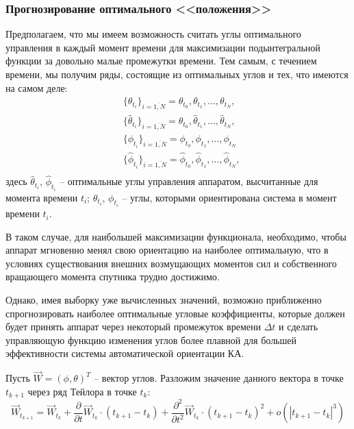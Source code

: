 \subsubsection{Прогнозирование оптимального <<положения>>}
\noindent\indent Предполагаем, что мы имеем возможность считать углы оптимального
управления в каждый момент времени для максимизации подынтегральной функции за довольно
малые промежутки времени. Тем самым, с течением времени, мы получим ряды, состоящие
из оптимальных углов и тех, что имеются на самом деле:
\begin{equation}
  \begin{aligned}
    &\{\theta_{t_i}\}_{i=\overline{1,N}} = \theta_{t_0}, \theta_{t_1}, ..., \theta_{t_N}, \\
    &\{\hat{\theta}_{t_i}\}_{i=\overline{1,N}} = \hat{\theta}_{t_0}, \hat{\theta}_{t_1}, ..., \hat{\theta}_{t_N}, \\
    &\{\phi_{t_i}\}_{i=\overline{1,N}} = \phi_{t_0}, \phi_{t_1}, ..., \phi_{t_N} \\
    &\{\hat{\phi}_{t_i}\}_{i=\overline{1,N}} = \hat{\phi}_{t_0}, \hat{\phi}_{t_1}, ..., \hat{\phi}_{t_N}, \\
  \end{aligned}
\end{equation}
здесь $\hat{\theta}_{t_i}$, $\hat{\phi}_{t_i}$ -- оптимальные углы управления аппаратом,
высчитанные для момента времени $t_i$; $\theta_{t_i}$, $\phi_{t_i}$ -- углы, которыми
ориентирована система в момент времени $t_i$.\par
  В таком случае, для наибольшей максимизации функционала, необходимо, чтобы
аппарат мгновенно менял свою ориентацию на наиболее оптимальную, что в условиях
существования внешних возмущающих моментов сил и собственного вращающего момента
спутника трудно достижимо.\par
  Однако, имея выборку уже вычисленных значений, возможно приближенно спрогнозировать
наиболее оптимальные угловые коэффициенты, которые должен будет принять аппарат
через некоторый промежуток времени $\Delta t$ и сделать управляющую функцию изменения
углов более плавной для большей эффективности системы автоматической ориентации КА.\par
  Пусть $\vec{W} = (\phi, \theta)^T$ -- вектор углов. Разложим значение данного вектора
в точке $t_{k+1}$ через ряд Тейлора в точке $t_{k}$:
\begin{equation} \label{eq:parialWEquatation}
  \vec{W}_{t_{k+1}} = \vec{W}_{t_{k}}
  + \frac{\partial}{\partial t}\vec{W}_{t_{k}} \cdot (t_{k+1} - t_{k})
  + \frac{\partial^2}{\partial t^2}\vec{W}_{t_{k}} \cdot (t_{k+1} - t_{k})^2
  + o(|t_{k+1} - t_{k}|^3)
\end{equation}\par
